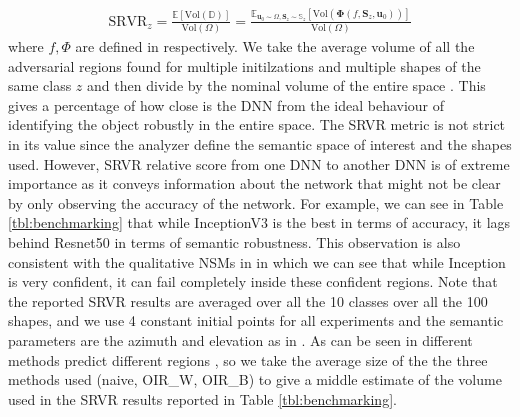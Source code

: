 \begin{equation}
\begin{aligned} 
 \text{SRVR}_{z} =  \frac{\mathbb{E}[\text{Vol}(\mathbb{D})]}{\text{Vol}(\Omega)} = \frac{\mathbb{E}_{\mathbf{u}_{0}\sim \Omega,\mathbf{S}_{z}\sim \mathbb{S}_{z}} [\text{Vol}(\mathbf{\Phi}(f,\mathbf{S}_{z},\mathbf{u}_{0}))]}{\text{Vol}(\Omega)} 
\label{eq:SRVR}
\end{aligned}
\end{equation}
where $f,\Phi$ are defined in \eqLabel{\ref{eq:f},\ref{eq:phi-rob}} respectively. We take the average volume of all the adversarial regions found for multiple initilzations and multiple shapes of the same class $z$ and then divide by the nominal volume of the entire space . This gives a percentage of how close is the DNN from the ideal behaviour of identifying the object robustly in the entire space. The SRVR metric is not strict in its value since the analyzer define the semantic space of interest and the shapes used. However, SRVR relative score from one DNN to another DNN is of extreme importance as it conveys information about the network that might not be clear by only observing the accuracy of the network. For example, we can see in Table \ref{tbl:benchmarking} that while InceptionV3 \cite{inception} is the best in terms of accuracy, it lags behind Resnet50\cite{resnet} in terms of semantic robustness. This observation is also consistent with the qualitative  NSMs in \figLabel{\ref{fig:NMS}} in which we can see that while Inception is very confident, it can fail completely inside these confident regions. Note that the reported SRVR results are averaged over all the 10 classes over all the 100 shapes, and we use 4 constant initial points for all experiments and the semantic parameters are the azimuth and elevation as in \figLabel{\ref{fig:operator},\ref{fig:NMS}}. As can be seen in \figLabel{\ref{fig:operator}} different methods predict different regions , so we take the average size of the the three methods used (naive, OIR\_W, OIR\_B) to give a middle estimate of the volume used in the SRVR results reported in Table \ref{tbl:benchmarking}.


